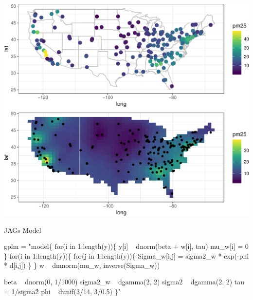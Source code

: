 \documentclass[11pt,ignorenonframetext,]{beamer}
\newenvironment{Shaded}{}{}
\newcommand{\NormalTok}[1]{#1}
\newcommand{\StringTok}[1]{\textcolor[rgb]{0.25,0.44,0.63}{#1}}
\let\oldShaded\Shaded
\let\endoldShaded\endShaded
\renewenvironment{Shaded}{\footnotesize\begin{spacing}{0.9}\oldShaded}{\endoldShaded\end{spacing}}
\begin{document}
\begin{frame}{}
\protect\hypertarget{section-7}{}

\begin{center}\includegraphics[width=\textwidth]{Lec19_files/figure-beamer/unnamed-chunk-43-1} \end{center}

\end{frame}

\begin{frame}[fragile]{JAGs Model}
\protect\hypertarget{jags-model}{}

\begin{Shaded}
\begin{Highlighting}[]
\NormalTok{gplm =}\StringTok{ "model\{}
\StringTok{  for(i in 1:length(y))\{}
\StringTok{    y[i] ~ dnorm(beta + w[i], tau)}
\StringTok{    mu_w[i] = 0}
\StringTok{  \}}
\StringTok{ }
\StringTok{  for(i in 1:length(y))\{}
\StringTok{    for(j in 1:length(y))\{}
\StringTok{      Sigma_w[i,j] = sigma2_w * exp(-phi * d[i,j])}
\StringTok{    \}}
\StringTok{  \}}
\StringTok{  w ~ dmnorm(mu_w, inverse(Sigma_w))}

\StringTok{  beta ~ dnorm(0, 1/1000)}
\StringTok{  sigma2_w ~ dgamma(2, 2)}
\StringTok{  sigma2 ~ dgamma(2, 2)}
\StringTok{  tau = 1/sigma2}
\StringTok{  phi ~ dunif(3/14, 3/0.5)}
\StringTok{\}"}
\end{Highlighting}
\end{Shaded}

\end{frame}
\end{document}
